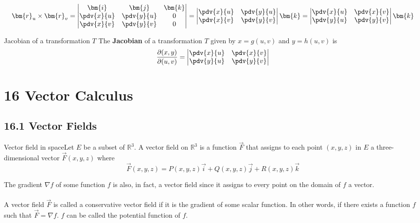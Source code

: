 \documentclass{article}
\begin{document}
	\begingroup
	\renewcommand*{\arraystretch}{1.55}
	\[
		\bm{r}_{u} \times \bm{r}_{v} =
		\begin{vmatrix}
			\bm{i}     & \bm{j}     & \bm{k} \\
			\pdv{x}{u} & \pdv{y}{u} & 0      \\
			\pdv{x}{v} & \pdv{y}{v} & 0      \\
		\end{vmatrix}
		=
		\begin{vmatrix}
			\pdv{x}{u} & \pdv{y}{u} \\
			\pdv{x}{v} & \pdv{y}{v} \\
		\end{vmatrix}\bm{k}=
		\begin{vmatrix}
			\pdv{x}{u} & \pdv{x}{v} \\
			\pdv{y}{u} & \pdv{y}{v} \\
		\end{vmatrix}\bm{k}
	\]
	\endgroup

	\begin{mybox}
		{Jacobian of a transformation $T$} The \textbf{Jacobian} of a transformation
		$T$ given by $x=g(u,v)$ and $y=h(u,v)$ is \begingroup
		\renewcommand*{\arraystretch}{1.55}
		\[
			\frac{\partial (x,y)}{\partial (u,v)}=
			\begin{vmatrix}
				\pdv{x}{u} & \pdv{x}{v} \\
				\pdv{y}{u} & \pdv{y}{v} \\
			\end{vmatrix}
		\]
		\endgroup
	\end{mybox}
	\newpage
	\section{16 Vector Calculus}
	\subsection{16.1 Vector Fields}
	\begin{mybox}
		{Vector field in space}Let $E$ be a subset of $\mathbb{R}^{3}$. A vector field
		on $\mathbb{R}^{3}$ is a function $\vec{F}$ that assigns to each point $(x,y,
		z)$ in $E$ a three-dimensional vector $\vec{F}(x,y,z)$ where
		\[
			\vec{F}(x,y,z) = P(x,y,z)\vec{i}+ Q(x,y,z)\vec{j}+ R(x,y,z)\vec{k}
		\]
	\end{mybox}
	The gradient $\nabla f$ of some function $f$ is also, in fact, a vector field
	since it assigns to every point on the domain of $f$ a vector. \\\\A vector field
	$\vec{F}$ is called a conservative vector field if it is the gradient of some scalar
	function. In other words, if there exists a function $f$ such that $\vec{F}= \nabla
	f$. $f$ can be called the potential function of $f$.
\end{document}
